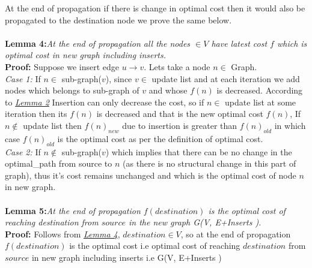 \documentclass[a4paper]{article}
\begin{document}
At the end of propagation if there is change in optimal cost then it would also be propagated to the destination node we prove the same below.\\
\\
\hypertarget{Lemma 4}{\textbf{Lemma 4:}}\textit{At the end of propagation all the nodes $\in V$ have latest cost $f$ which is optimal cost in new graph including inserts.}\\
\textbf{Proof:} Suppose we insert edge $u \rightarrow v$. Lets take a node $n \in$ Graph.\\
\textit{Case 1:} If $n \in$ sub-graph($v$), since $v \in$ update list and at each iteration we add nodes which belongs to sub-graph of $v$ and whose $f(n)$ is decreased. According to \hyperlink{Lemma 2}{\textit{Lemma 2}} Insertion can only decrease the cost, so if $n \in$ update list at some iteration then its $f(n)$ is decreased and that is the new optimal cost $f(n)$, If $n \notin$ update list then $f(n)_{new}$ due to insertion is greater than $f(n)_{old}$ in which case $f(n)_{old}$ is the optimal cost as per the definition of optimal cost.\\
\textit{Case 2:} If $n \notin$ sub-graph($v$) which implies that there can be no change in the optimal\_path from source to $n$ (as there is no structural change in this part of graph), thus it's cost remains unchanged and which is the optimal cost of node $n$ in new graph.
\\
\\
\hypertarget{Lemma 5}{\textbf{Lemma 5:}}\textit{At the end of propagation $f(destination)$ is the optimal cost of reaching destination from $source$ in the new graph G(V, E+Inserts ).}\\
\textbf{Proof:} Follows from \hyperlink{Lemma 4}{\textit{Lemma 4}}, $destination \in V$, so at the end of propagation $f(destination)$ is the optimal cost i.e optimal cost of reaching $destination$ from $source$ in new graph including inserts i.e G(V, E+Inserts )\\
\\
\end{document}
